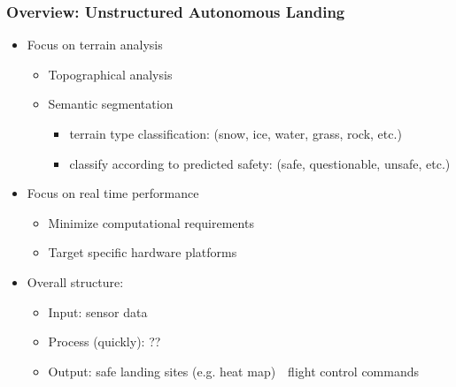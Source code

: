 \documentclass[aspectratio=169]{rubeamer}
\newif\ifpause
\newcommand{\mypause}{\ifpause \pause \fi}
\begin{document}
\begin{frame}
  \frametitle{Overview: Unstructured Autonomous Landing}
  \begin{itemize}
    \item Focus on terrain analysis
    \begin{itemize}
      \mypause
      \item Topographical analysis%
      \mypause
      \item Semantic segmentation%
      \begin{itemize}
        \item terrain type classification: (snow, ice, water, grass, rock, etc.)
        \mypause
        \item classify according to predicted safety: (safe, questionable, unsafe, etc.)
      \end{itemize}
    \end{itemize}
    \mypause
    \item Focus on real time performance
    \begin{itemize}
      \mypause
      \item Minimize computational requirements
      \mypause
      \item Target specific hardware platforms
    \end{itemize}
    \mypause
    \item Overall structure:
    \begin{itemize}
      \item Input: sensor data
      \item Process (quickly): ??
      \item Output: safe landing sites (e.g. heat map)\mypause~\textrightarrow~flight control commands
    \end{itemize}

\end{itemize}
\end{frame}
\end{document}
